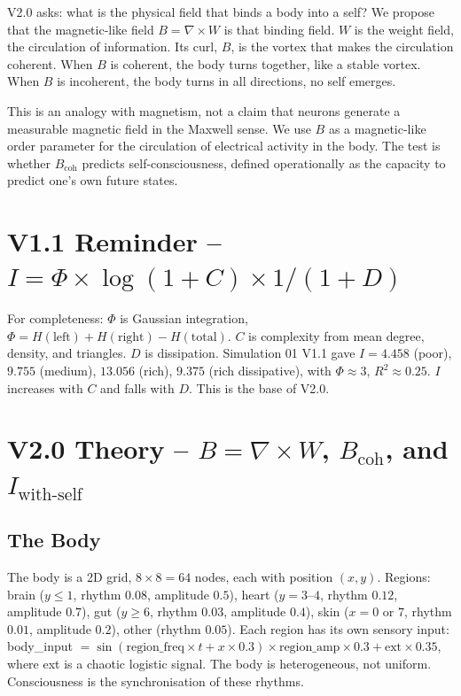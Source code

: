 \documentclass[11pt,a4paper]{article}
\begin{document}
V2.0 asks: what is the physical field that binds a body into a self? We propose that the magnetic-like field $B = \nabla \times W$ is that binding field. $W$ is the weight field, the circulation of information. Its curl, $B$, is the vortex that makes the circulation coherent. When $B$ is coherent, the body turns together, like a stable vortex. When $B$ is incoherent, the body turns in all directions, no self emerges.

This is an analogy with magnetism, not a claim that neurons generate a measurable magnetic field in the Maxwell sense. We use $B$ as a magnetic-like order parameter for the circulation of electrical activity in the body. The test is whether $B_{\text{coh}}$ predicts self-consciousness, defined operationally as the capacity to predict one's own future states.

\section{V1.1 Reminder -- $I = \Phi \times \log(1+C) \times 1/(1+D)$}
For completeness: $\Phi$ is Gaussian integration, $\Phi = H(\text{left}) + H(\text{right}) - H(\text{total})$. $C$ is complexity from mean degree, density, and triangles. $D$ is dissipation. Simulation 01 V1.1 gave $I = 4.458$ (poor), $9.755$ (medium), $13.056$ (rich), $9.375$ (rich dissipative), with $\Phi \approx 3$, $R^2 \approx 0.25$. $I$ increases with $C$ and falls with $D$. This is the base of V2.0.

\section{V2.0 Theory -- $B = \nabla \times W$, $B_{\text{coh}}$, and $I_{\text{with-self}}$}
\subsection{The Body}
The body is a 2D grid, $8 \times 8 = 64$ nodes, each with position $(x,y)$. Regions: brain ($y \leq 1$, rhythm $0.08$, amplitude $0.5$), heart ($y = 3$--$4$, rhythm $0.12$, amplitude $0.7$), gut ($y \geq 6$, rhythm $0.03$, amplitude $0.4$), skin ($x = 0$ or $7$, rhythm $0.01$, amplitude $0.2$), other (rhythm $0.05$). Each region has its own sensory input: body\_input $= \sin(\text{region\_freq} \times t + x \times 0.3) \times \text{region\_amp} \times 0.3 + \text{ext} \times 0.35$, where ext is a chaotic logistic signal. The body is heterogeneous, not uniform. Consciousness is the synchronisation of these rhythms.
\end{document}
